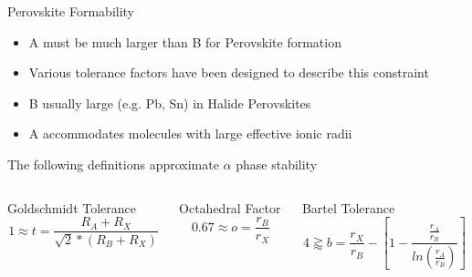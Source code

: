 \documentclass[10pt, aspectratio=169, presentation]{beamer}
\begin{document}
\begin{frame}[label={sec:orge41d492}]{Perovskite Formability}
\begin{itemize}
\item A must be much larger than B for Perovskite formation
\item Various tolerance factors have been designed to describe this constraint
\item B usually large (e.g. Pb, Sn) in Halide Perovskites
\item A accommodates \alert{molecules} with large effective ionic radii\autocite{kieslich-2015-exten-toler}
\end{itemize}

The following definitions approximate \(\alpha\) phase stability
\autocite{yin-2015-halid-perov,bartel-2019-new-toler}
\begin{columns}
\begin{column}{0.33\columnwidth}
\begin{block}{Goldschmidt Tolerance}
\[
1 \approx t = \frac{R_A+R_X}{\sqrt{2}*(R_B+R_X)}
\]
\end{block}
\end{column}

\begin{column}{0.33\columnwidth}
\begin{block}{Octahedral Factor}
\[
0.67 \approx o=\frac{r_B}{r_X}
\]
\end{block}
\end{column}

\begin{column}{0.33\columnwidth}
\begin{block}{Bartel Tolerance}
\[
4 \gtrapprox b = \frac{r_X}{r_B}-\left[ 1-\frac{\frac{r_A}{r_B}}{ln(\frac{r_A}{r_B})} \right]
\]
\end{block}
\end{column}
\end{columns}
\end{frame}
\end{document}
